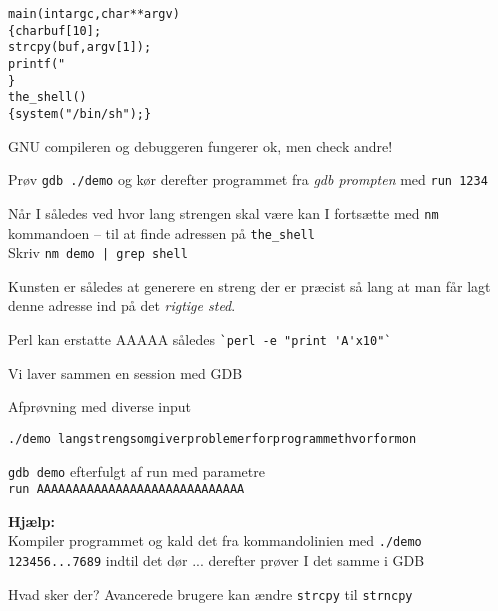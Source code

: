 \documentclass[Screen16to9,17pt]{foils}
\begin{document}
\begin{alltt}\small
main(int argc, char **argv)
\{      char buf[10];
        strcpy(buf, argv[1]);
        printf("%s\textbackslash{}n",buf);
\}
the_shell()
\{  system("/bin/sh");  \}
\end{alltt}



\begin{list1}
\item GNU compileren og debuggeren fungerer ok, men check andre!
\item Prøv \verb+gdb ./demo+ og kør derefter programmet fra \emph{gdb prompten}
med  \verb+run 1234+
\item Når I således ved hvor lang strengen skal være kan I fortsætte
  med \verb+nm+ kommandoen -- til at finde adressen på
  \verb+the_shell+\\
Skriv \verb+nm demo | grep shell+

\item Kunsten er således at generere en streng der er præcist så lang
  at man får lagt denne adresse ind på det \emph{rigtige sted}.
\item Perl kan erstatte AAAAA således \verb+`perl -e "print 'A'x10"`+
\end{list1}



\begin{list1}
\item Vi laver sammen en session med GDB
\item Afprøvning med diverse input
\begin{list2}
\item \verb+./demo langstrengsomgiverproblemerforprogrammethvorformon+
\item \verb+gdb demo+ efterfulgt af run med parametre\\
\verb+run AAAAAAAAAAAAAAAAAAAAAAAAAAAAA+
\end{list2}
\end{list1}

{\bfseries Hjælp:}\\
Kompiler programmet og kald det fra kommandolinien med
\verb+./demo 123456...7689+ indtil det dør ... derefter prøver I det
samme i GDB

Hvad sker der? Avancerede brugere kan ændre
\verb+strcpy+ til \verb+strncpy+


\end{document}
